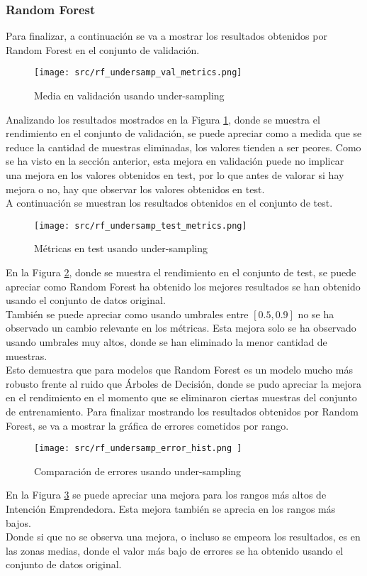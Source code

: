 \subsubsection*{Random Forest}
Para finalizar, a continuación se va a mostrar los resultados obtenidos por Random Forest en el conjunto de validación.
\begin{figure}[H]
	\centering
	\texttt{[image: src/rf\_undersamp\_val\_metrics.png]}
	\caption{Media en validación usando under-sampling}
	\label{fig:cmp_val_rf}
\end{figure}
Analizando los resultados mostrados en la Figura \ref{fig:cmp_val_rf}, donde se muestra el rendimiento en el conjunto de validación, se puede apreciar como a medida que se reduce la cantidad de muestras eliminadas, los valores tienden a ser peores. Como se ha visto en la sección anterior, esta mejora en validación puede no implicar una mejora en los valores obtenidos en test, por lo que antes de valorar si hay mejora o no, hay que observar los valores obtenidos en test.\\
\clearpage
A continuación se muestran los resultados obtenidos en el conjunto de test.
\begin{figure}[H]
	\centering
	\texttt{[image: src/rf\_undersamp\_test\_metrics.png]}
	\caption{Métricas en test usando under-sampling}
	\label{fig:cmp_test_rf}
\end{figure}
En la Figura \ref{fig:cmp_test_rf}, donde se muestra el rendimiento en el conjunto de test, se puede apreciar como Random Forest ha obtenido los mejores resultados se han obtenido usando el conjunto de datos original.\\
\linebreak
También se puede apreciar como usando umbrales entre $\left[0.5,0.9\right]$ no se ha observado un cambio relevante en los métricas. Esta mejora solo se ha observado usando umbrales muy altos, donde se han eliminado la menor cantidad de muestras.\\
\linebreak
Esto demuestra que para modelos que Random Forest es un modelo mucho más robusto frente al ruido que Árboles de Decisión, donde se pudo apreciar la mejora en el rendimiento en el momento que se eliminaron ciertas muestras del conjunto de entrenamiento.
\clearpage
Para finalizar mostrando los resultados obtenidos por Random Forest, se va a mostrar la gráfica de errores cometidos por rango.
\begin{figure}[H]
	\centering
	\texttt{[image: src/rf\_undersamp\_error\_hist.png ]}
	\caption{Comparación de errores usando under-sampling}
	\label{fig:cmp_error_rf}
\end{figure}
En la Figura \ref{fig:cmp_error_rf} se puede apreciar una mejora para los rangos más altos de Intención Emprendedora. Esta mejora también se aprecia en los rangos más bajos. \\
Donde si que no se observa una mejora, o incluso se empeora los resultados, es en las zonas medias, donde el valor más bajo de errores se ha obtenido usando el conjunto de datos original.
\clearpage
